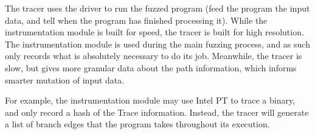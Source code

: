 The tracer uses the driver to run the fuzzed program (feed the program the
input data, and tell when the program has finished processing it). While the
instrumentation module is built for speed, the tracer is built for high
resolution.  The instrumentation module is used during the main fuzzing
process, and as such only records what is absolutely necessary to do its job.
Meanwhile, the tracer is slow, but gives more granular data about the path
information, which informs smarter mutation of input data.

For example, the instrumentation module may use Intel PT to trace a binary, and
only record a hash of the Trace information.  Instead, the tracer will generate
a list of branch edges that the program takes throughout its execution.
